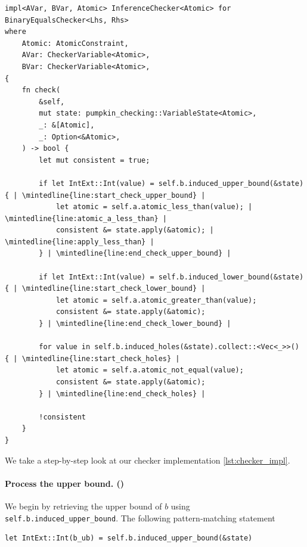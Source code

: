 \documentclass{article}
\begin{document}
        \begin{listing}[H]
            \begin{verbatim}
impl<AVar, BVar, Atomic> InferenceChecker<Atomic> for BinaryEqualsChecker<Lhs, Rhs>
where
    Atomic: AtomicConstraint,
    AVar: CheckerVariable<Atomic>,
    BVar: CheckerVariable<Atomic>,
{
    fn check(
        &self,
        mut state: pumpkin_checking::VariableState<Atomic>,
        _: &[Atomic],
        _: Option<&Atomic>,
    ) -> bool {
        let mut consistent = true;

        if let IntExt::Int(value) = self.b.induced_upper_bound(&state) { | \mintedline{line:start_check_upper_bound} |
            let atomic = self.a.atomic_less_than(value); | \mintedline{line:atomic_a_less_than} |
            consistent &= state.apply(&atomic); | \mintedline{line:apply_less_than} |
        } | \mintedline{line:end_check_upper_bound} |

        if let IntExt::Int(value) = self.b.induced_lower_bound(&state) { | \mintedline{line:start_check_lower_bound} |
            let atomic = self.a.atomic_greater_than(value);
            consistent &= state.apply(&atomic);
        } | \mintedline{line:end_check_lower_bound} |

        for value in self.b.induced_holes(&state).collect::<Vec<_>>() { | \mintedline{line:start_check_holes} |
            let atomic = self.a.atomic_not_equal(value);
            consistent &= state.apply(&atomic);
        } | \mintedline{line:end_check_holes} |

        !consistent
    }
}
            \end{verbatim}
            \caption{Our \texttt{InferenceChecker} implementation}
            \label{lst:checker_impl}
        \end{listing}

We take a step-by-step look at our checker implementation \autoref{lst:checker_impl}.

\paragraph{Process the upper bound.
()}
We begin by retrieving the upper bound of $b$ using
\texttt{self.b.induced_upper_bound}. The following pattern‑matching
statement

\begin{center}
\begin{minipage}{0.55\linewidth}
\begin{verbatim}
let IntExt::Int(b_ub) = self.b.induced_upper_bound(&state)
\end{verbatim}
\end{minipage}
\end{center}
\end{document}
